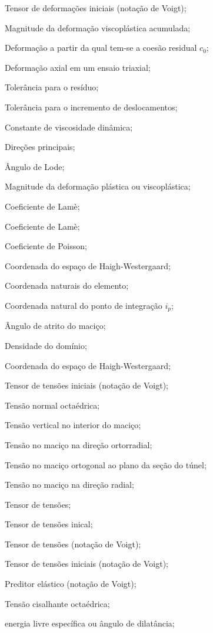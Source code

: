 \item[$ \varepsilonl_0 $] Tensor de deformações iniciais (notação de Voigt);
\item[$\bar{\varepsilon}^{vp}$] Magnitude da deformação viscoplástica acumulada;
\item[$ \varepsilon_0 $] Deformação a partir da qual tem-se a coesão residual $c_0$;
\item[$ \varepsilon_a $] Deformação axial em um ensaio triaxial;
\item[$ \varepsilon_R $] Tolerância para o resíduo;
\item[$ \varepsilon_u $] Tolerância para o incremento de deslocamentos;

\item[$ \eta $] 		Constante de viscosidade dinâmica;
\item[$\eta_1,\eta_2,\eta_3$] 	Direções principais;
\item[$ \theta $] 		Ângulo de Lode;
\item[$\lambda$] 	Magnitude da deformação plástica ou viscoplástica;
\item[$\lambda^e$] 	Coeficiente de Lamè;
\item[$\mu^e$] 	Coeficiente de Lamè;
\item[$ \nu $] 			Coeficiente de Poisson;
\item[$ \xi_{H} $] 				Coordenada do espaço de Haigh-Westergaard;
\item[$\underline \xi$] 				Coordenada naturais do elemento;
\item[$\xil_{i_p}$] 				Coordenada natural do ponto de integração $i_p$;


\item[$ \phi $] 		Ângulo de atrito do maciço;
\item[$ \rho $] 		Densidade do domínio;
\item[$ \rho_{H} $] 		Coordenada do espaço de Haigh-Westergaard;

\item[$ \sigmal^{INI} $] 	Tensor de tensões iniciais (notação de Voigt);
\item[$ \sigma_{oct} $] 	Tensão normal octaédrica;
\item[$ \sigma_{v} $] 	Tensão vertical no interior do maciço;
\item[$ \sigma_{\theta \theta} $] Tensão no maciço na direção ortorradial;
\item[$ \sigma_{zz} $] 	Tensão no maciço ortogonal ao plano da seção do túnel;
\item[$ \sigma_{rr} $] 	Tensão no maciço na direção radial;
\item[$ \sigmall $] 	Tensor de tensões;
\item[$ \sigmall_0 $] 	Tensor de tensões inical;
\item[$ \sigmal $] 	Tensor de tensões (notação de Voigt);
\item[$ \sigmal_0 $] 	Tensor de tensões iniciais (notação de Voigt);
\item[$ \sigmal^{trial} $] 	Preditor elástico (notação de Voigt);
\item[$ \tau_{oct} $] 	Tensão cisalhante octaédrica;
\item[$\psi$] energia livre específica ou ângulo de dilatância;

